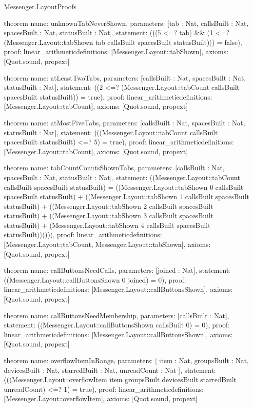 \begin{lexlean}{Messenger.LayoutProofs}
\begin{semanticmodule}
theorem{
  name: unknownTabNeverShown,
  parameters: [tab : Nat, callsBuilt : Nat, spacesBuilt : Nat, statusBuilt : Nat],
  statement: (((5 <=? tab) && (1 <=? (Messenger.Layout::tabShown tab callsBuilt spacesBuilt statusBuilt))) = false),
  proof: linear_arithmetic{definitions: [Messenger.Layout::tabShown]},
  axioms: [Quot.sound, propext]
}

theorem{
  name: atLeastTwoTabs,
  parameters: [callsBuilt : Nat, spacesBuilt : Nat, statusBuilt : Nat],
  statement: ((2 <=? (Messenger.Layout::tabCount callsBuilt spacesBuilt statusBuilt)) = true),
  proof: linear_arithmetic{definitions: [Messenger.Layout::tabCount]},
  axioms: [Quot.sound, propext]
}

theorem{
  name: atMostFiveTabs,
  parameters: [callsBuilt : Nat, spacesBuilt : Nat, statusBuilt : Nat],
  statement: (((Messenger.Layout::tabCount callsBuilt spacesBuilt statusBuilt) <=? 5) = true),
  proof: linear_arithmetic{definitions: [Messenger.Layout::tabCount]},
  axioms: [Quot.sound, propext]
}

theorem{
  name: tabCountCountsShownTabs,
  parameters: [callsBuilt : Nat, spacesBuilt : Nat, statusBuilt : Nat],
  statement: ((Messenger.Layout::tabCount callsBuilt spacesBuilt statusBuilt) = ((Messenger.Layout::tabShown 0 callsBuilt spacesBuilt statusBuilt) + ((Messenger.Layout::tabShown 1 callsBuilt spacesBuilt statusBuilt) + ((Messenger.Layout::tabShown 2 callsBuilt spacesBuilt statusBuilt) + ((Messenger.Layout::tabShown 3 callsBuilt spacesBuilt statusBuilt) + (Messenger.Layout::tabShown 4 callsBuilt spacesBuilt statusBuilt)))))),
  proof: linear_arithmetic{definitions: [Messenger.Layout::tabCount, Messenger.Layout::tabShown]},
  axioms: [Quot.sound, propext]
}

theorem{
  name: callButtonsNeedCalls,
  parameters: [joined : Nat],
  statement: ((Messenger.Layout::callButtonsShown 0 joined) = 0),
  proof: linear_arithmetic{definitions: [Messenger.Layout::callButtonsShown]},
  axioms: [Quot.sound, propext]
}

theorem{
  name: callButtonsNeedMembership,
  parameters: [callsBuilt : Nat],
  statement: ((Messenger.Layout::callButtonsShown callsBuilt 0) = 0),
  proof: linear_arithmetic{definitions: [Messenger.Layout::callButtonsShown]},
  axioms: [Quot.sound, propext]
}

theorem{
  name: overflowItemInRange,
  parameters: [
    item : Nat,
    groupsBuilt : Nat,
    devicesBuilt : Nat,
    starredBuilt : Nat,
    unreadCount : Nat
  ],
  statement: (((Messenger.Layout::overflowItem item groupsBuilt devicesBuilt starredBuilt unreadCount) <=? 1) = true),
  proof: linear_arithmetic{definitions: [Messenger.Layout::overflowItem]},
  axioms: [Quot.sound, propext]
}


\end{semanticmodule}
\end{lexlean}
